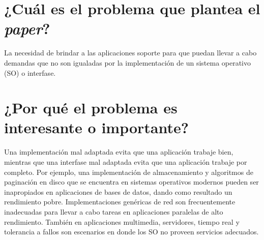 \section{¿Cuál es el problema que plantea el \textit{paper}?}
La necesidad de brindar a las aplicaciones soporte para que puedan llevar a cabo demandas que no son igualadas por la implementación de un sistema operativo (SO) o interfase.

\section{¿Por qué el problema es interesante o importante?}
Una implementación mal adaptada evita que una aplicación trabaje bien, mientras que una interfase mal adaptada evita que una aplicación trabaje por completo. Por ejemplo, una implementación de almacenamiento y algoritmos de paginación en disco que se encuentra en sistemas operativos modernos pueden ser inapropiados en aplicaciones de bases de datos, dando como resultado un rendimiento pobre. Implementaciones genéricas de red son frecuentemente inadecuadas para llevar a cabo tareas en aplicaciones paralelas de alto rendimiento. También en aplicaciones multimedia, servidores, tiempo real y tolerancia a fallos son escenarios en donde los SO no proveen servicios adecuados.


